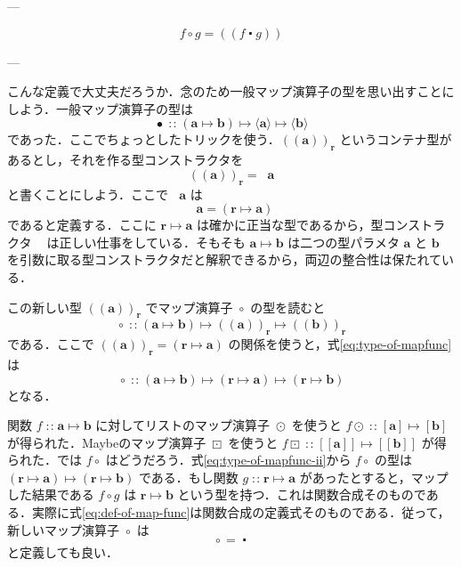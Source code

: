 \documentclass[a4paper,twocolumn]{jsbook}
\def\[{\left[\!\left[}
\def\]{\right]\!\right]}
\def\({\left(\!\left(}
\def\){\right)\!\right)}
\DeclareMathOperator{\mComp}{\centerdot}
\DeclareMathOperator{\mIn}{{:\!:}}
\DeclareMathOperator{\mMap}{\bullet}
\DeclareMathOperator{\mMapFunc}{\circ}
\DeclareMathOperator{\mMapList}{\odot}
\DeclareMathOperator{\mMapMaybe}{\boxdot}
\DeclareMathOperator{\mMapsTo}{\mapsto}
\newcommand{\mType}[1]{\mathbf{#1}}
\newcommand{\mFuncWith}[1]{\(#1\)}
\newcommand{\mListWith}[1]{\left[#1\right]}
\newcommand{\mMaybeWith}[1]{\[#1\]}
\newcommand{\mPureWith}[1]{\langle#1\rangle}
\newcommand{\mFuncType}[1]{\(\mType{#1}\)_\mType{r}}
\newcommand{\mListType}[1]{\mListWith{\mType{#1}}}
\newcommand{\mMaybeType}[1]{\mMaybeWith{\mType{#1}}}
\newcommand{\mPureType}[1]{\mPureWith{\mType{#1}}}
\newcommand{\mTypeConstructor}[1]{\mathit{#1}} %
\DeclareMathOperator{\mFuncTypeConstructor}{\mTypeConstructor{Func}_\mType{r}}
\newcommand{\mProj}[2]{#1\mMapsTo#2}
\begin{document}
---

$$
f\mMapFunc g=\mFuncWith{f\mComp g}
$$

---


こんな定義で大丈夫だろうか．念のため一般マップ演算子の型を思い出すことにしよう．一般マップ演算子の型は
\begin{equation}
\mMap
\mIn{}
\mProj{
  (\mProj{\mType{a}}{\mType{b}})
}
{
  \mProj{\mPureType{a}}{\mPureType{b}}
}
\end{equation}
であった．ここでちょっとしたトリックを使う．$\mFuncType{a}$ というコンテナ型があるとし，それを作る型コンストラクタを
\begin{equation}
\mFuncType{a}=\mFuncTypeConstructor\mType{a}
\end{equation}
と書くことにしよう．ここで $\mFuncTypeConstructor\mType{a}$ は
\begin{equation}
\mFuncTypeConstructor\mType{a}=(\mProj{\mType{r}}{\mType{a}})
\end{equation}
であると定義する．ここに $\mProj{\mType{r}}{\mType{a}}$ は確かに正当な型であるから，型コンストラクタ $\mFuncTypeConstructor$ は正しい仕事をしている．そもそも $\mProj{\mType{a}}{\mType{b}}$ は二つの型パラメタ $\mType{a}$ と $\mType{b}$ を引数に取る型コンストラクタだと解釈できるから，両辺の整合性は保たれている．

この新しい型 $\mFuncType{a}$ でマップ演算子 $\mMapFunc$ の型を読むと
\begin{equation}
\label{eq:type-of-mapfunc}
\mMapFunc
\mIn{}
\mProj{
  (\mProj{\mType{a}}{\mType{b}})
}
{
  \mProj{\mFuncType{a}}{\mFuncType{b}}
}
\end{equation}
である．ここで $\mFuncType{a}=(\mProj{\mType{r}}{\mType{a}})$ の関係を使うと，式\eqref{eq:type-of-mapfunc}は
\begin{equation}
\label{eq:type-of-mapfunc-ii}
\mMapFunc
\mIn{}
\mProj{
  (\mProj{\mType{a}}{\mType{b}})
}
{
  \mProj{(\mProj{\mType{r}}{\mType{a}})}{(\mProj{\mType{r}}{\mType{b}})}
}
\end{equation}
となる．

関数 $f\mIn\mProj{\mType{a}}{\mType{b}}$ に対してリストのマップ演算子 $\mMapList$ を使うと $f\mMapList\mIn\mProj{\mListType{a}}{\mListType{b}}$ が得られた．Maybeのマップ演算子 $\mMapMaybe$ を使うと $f\mMapMaybe\mIn\mProj{\mMaybeType{a}}{\mMaybeType{b}}$ が得られた．では $f\mMapFunc$ はどうだろう．式\eqref{eq:type-of-mapfunc-ii}から $f\mMapFunc$ の型は $\mProj{(\mProj{\mType{r}}{\mType{a}})}{(\mProj{\mType{r}}{\mType{b}})}$ である．もし関数 $g\mIn\mProj{\mType{r}}{\mType{a}}$ があったとすると，マップした結果である $f\mMapFunc g$ は $\mProj{\mType{r}}{\mType{b}}$ という型を持つ．これは関数合成そのものである．実際に式\eqref{eq:def-of-map-func}は関数合成の定義式そのものである．従って，新しいマップ演算子 $\mMapFunc$ は
\begin{equation}
\mMapFunc=\mComp
\end{equation}
と定義しても良い．
\end{document}
